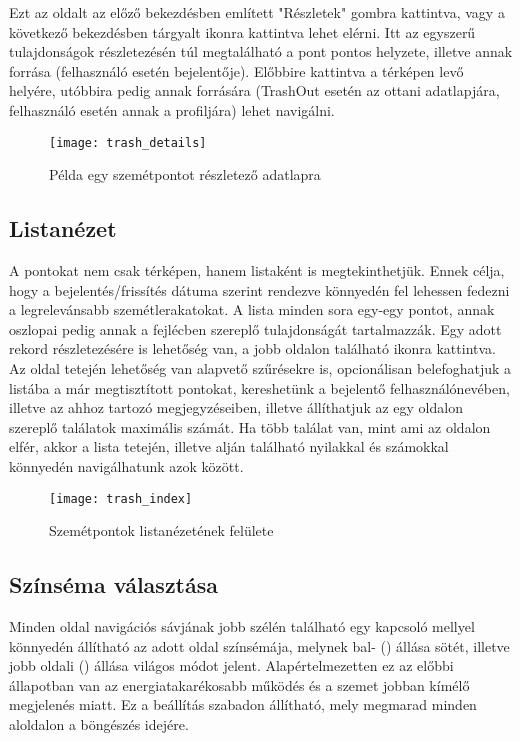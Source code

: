 Ezt az oldalt az előző bekezdésben említett "Részletek" gombra kattintva, vagy a következő bekezdésben tárgyalt  ikonra kattintva lehet elérni. Itt az egyszerű tulajdonságok részletezésén túl megtalálható a pont pontos helyzete, illetve annak forrása (felhasználó esetén bejelentője). Előbbire kattintva a térképen levő helyére, utóbbira pedig annak forrására (TrashOut esetén az ottani adatlapjára, felhasználó esetén annak a profiljára) lehet navigálni.

\begin{figure}[H]
	\centering
	\texttt{[image: trash\_details]}
	\caption{Példa egy szemétpontot részletező adatlapra}
	\label{fig:trash_details}
\end{figure}

\subsection{Listanézet}
\label{subsec:trash_index}

A pontokat nem csak térképen, hanem listaként is megtekinthetjük. Ennek célja, hogy a bejelentés/frissítés dátuma szerint rendezve könnyedén fel lehessen fedezni a legrelevánsabb szemétlerakatokat. A lista minden sora egy-egy pontot, annak oszlopai pedig annak a fejlécben szereplő tulajdonságát tartalmazzák. Egy adott rekord részletezésére is lehetőség van, a jobb oldalon található  ikonra kattintva. Az oldal tetején lehetőség van alapvető szűrésekre is, opcionálisan belefoghatjuk a listába a már megtisztított pontokat, kereshetünk a bejelentő felhasználónevében, illetve az ahhoz tartozó megjegyzéseiben, illetve állíthatjuk az egy oldalon szereplő találatok maximális számát. Ha több találat van, mint ami az oldalon elfér, akkor a lista tetején, illetve alján található nyilakkal és számokkal könnyedén navigálhatunk azok között.

\begin{figure}[H]
	\centering
	\texttt{[image: trash\_index]}
	\caption{Szemétpontok listanézetének felülete}
	\label{fig:trash_index}
\end{figure}


\subsection{Színséma választása}

Minden oldal navigációs sávjának jobb szélén található egy kapcsoló mellyel könnyedén állítható az adott oldal színsémája, melynek bal- () állása sötét, illetve jobb oldali () állása világos módot jelent. Alapértelmezetten ez az előbbi állapotban van az energiatakarékosabb működés és a szemet jobban kímélő megjelenés miatt. Ez a beállítás szabadon állítható, mely megmarad minden aloldalon a böngészés idejére.


